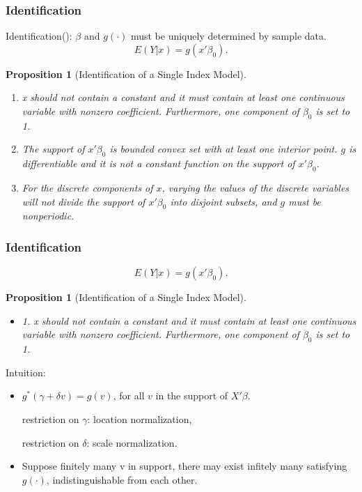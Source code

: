 \documentclass{beamer}
\begin{document}
\begin{frame}[t]
    \frametitle{Identification}
	  Identification(\citet{Horowitz09}): $\beta$ and $ g(\cdot)$ must be uniquely determined by sample data.
     \begin{equation}
		E(Y|x) = g(x'\beta_0).
	  \end{equation}
    \newtheorem{prop1}{Proposition}[section]   
	  \begin{prop1}[Identification of a Single Index Model] 
		
		\begin{enumerate}
        \item  x should not contain a constant and it must contain at least one continuous variable with nonzero coefficient. Furthermore, one component of $\beta_0$ is set to 1.
        \item  The support of $x'\beta_0$ is bounded convex set with at least one interior point. $g$ is differentiable and it is not a constant function on the support of $x'\beta_0$.
        \item  For the discrete components of $x$, varying the values of the discrete variables will not divide the support of $x'\beta_0$ into disjoint subsets, and $g$ must be nonperiodic.		
		\end{enumerate}
    
    \end{prop1}

\note{~}
\end{frame}


\begin{frame}[t]
    \frametitle{Identification}
     \begin{equation*}
		E(Y|x) = g(x'\beta_0).
	  \end{equation*}
    \newtheorem{prop2}{Proposition}[section]   
	  \begin{prop2}[Identification of a Single Index Model] 
		\begin{itemize}
		  \item 1. x should not contain a constant and it must contain at least one continuous variable with nonzero coefficient. Furthermore, one component of $\beta_0$ is set to 1.
		\end{itemize}
    \end{prop2}
    Intuition:
    \begin{itemize}
      
      \item $g^{*}(\gamma + \delta v) = g(v)$, for all $v$ in the support of $X'\beta$.
      
      	 restriction on $\gamma$: location normalization,
      	 
      	 restriction on $\delta$: scale normalization.
      \item Suppose finitely many v in support, there may exist infitely many satisfying $g(\cdot)$, indistinguishable from each other.
      
    \end{itemize}
    

\note{~}
\end{frame}
\end{document}
